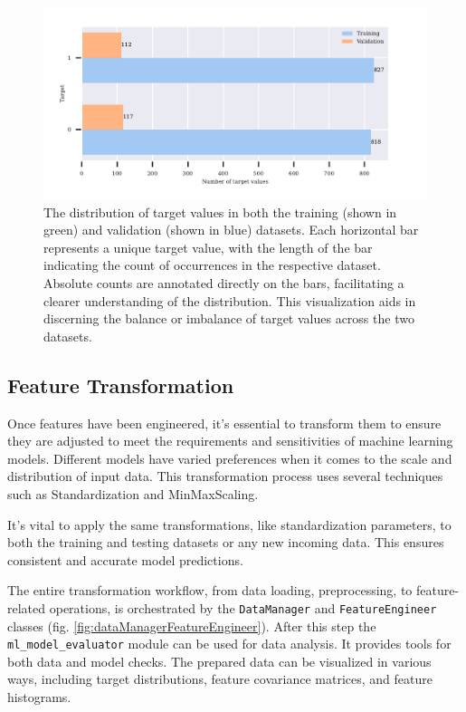 \begin{figure}[h]
\centering
\begin{adjustbox}{max width=1\textwidth,center}
    \includegraphics[scale=1]{./pdf/report/sig_distr.pdf}
\end{adjustbox}
    \caption{The distribution of target values in both the training (shown in green) and validation (shown in blue) datasets. Each horizontal bar represents a unique target value, with the length of the bar indicating the count of occurrences in the respective dataset. Absolute counts are annotated directly on the bars, facilitating a clearer understanding of the distribution. This visualization aids in discerning the balance or imbalance of target values across the two datasets.}
\label{fig:signal_distribution}
\end{figure}

\subsection{Feature Transformation}

Once features have been engineered, it's essential to transform them to ensure they are adjusted to meet the requirements and sensitivities of machine learning models. Different models have varied preferences when it comes to the scale and distribution of input data. This transformation process uses several techniques such as Standardization and MinMaxScaling.

It's vital to apply the same transformations, like standardization parameters, to both the training and testing datasets or any new incoming data. This ensures consistent and accurate model predictions.

The entire transformation workflow, from data loading, preprocessing, to feature-related operations, is orchestrated by the \texttt{DataManager} and \texttt{FeatureEngineer} classes (fig. \ref{fig:dataManagerFeatureEngineer}).
After this step the \texttt{ml\_model\_evaluator} module can be used for data analysis. It provides tools for both data and model checks. The prepared data can be visualized in various ways, including target distributions, feature covariance matrices, and feature histograms.

